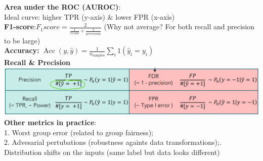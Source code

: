 \textbf{Area under the ROC (AUROC)}:\\
Ideal curve: higher TPR (y-axis) \& lower FPR (x-axis)\\
\textbf{F1-score}:$F_1 score = \frac{2}{\frac{1}{recall} + \frac{1}{precision}}$ (Why not average? For both recall and precision to be large) \\
\textbf{Accuracy:} $\operatorname{Acc}(y,\hat{y})=\frac{1}{n_{\mathrm{samples}}}\sum_i 1(\hat{y}_i=y_i)$ \\
\textbf{Recall \& Precision}
\includegraphics[width=\linewidth]{pics/figure6.PNG} \\
\textbf{Other metrics in practice}: \\
1. Worst group error (related to group fairness);\\
2. Advesarial pertubations (robustness againts data transformations);. Distribution shifts on the inputs (same label but data looks different)



